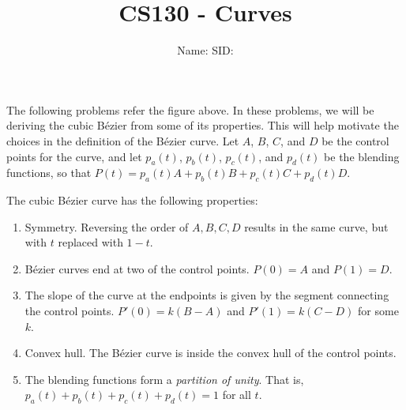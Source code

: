 \documentclass[12pt]{article}
\newcounter{problem}
\newcommand{\Bezier}{B\'ezier\xspace}
\newcommand{\TODOL}[1]{\textcolor{red}{\underline{\hspace{#1 cm}}}}
\begin{document}
\title{CS130 - Curves}
\date{}
\author{Name: \TODOL7\qquad\qquad SID: \TODOL4}
\maketitle
\begin{center}
\end{center}


\begin{center}
\end{center}

The following problems refer the figure above.  In these problems, we will be deriving the cubic  \Bezier from some of its properties.  This will help motivate the choices in the definition of the \Bezier curve.  Let $A$, $B$, $C$, and $D$ be the control points for the curve, and let $p_a(t)$, $p_b(t)$, $p_c(t)$, and $p_d(t)$ be the blending functions, so that $P(t) = p_a(t) A + p_b(t) B + p_c(t) C + p_d(t) D$.

The cubic \Bezier curve has the following properties:
\begin{enumerate}
\item Symmetry.  Reversing the order of $A,B,C,D$ results in the same curve, but with $t$ replaced with $1-t$. \label{prop:sym}
\item \Bezier curves end at two of the control points.  $P(0) = A$ and $P(1) = D$.\label{prop:ad}
\item The slope of the curve at the endpoints is given by the segment connecting the control points.  $P'(0) = k(B-A)$ and $P'(1) = k(C-D)$ for some $k$.\label{prop:slope}
\item Convex hull.  The \Bezier curve is inside the convex hull of the control points.\label{prop:hull}
\item The blending functions form a \textit{partition of unity}.  That is,
  $p_a(t)+p_b(t)+p_c(t)+p_d(t)=1$ for all $t$.  \label{prop:unity}
\end{enumerate}
\end{document}
